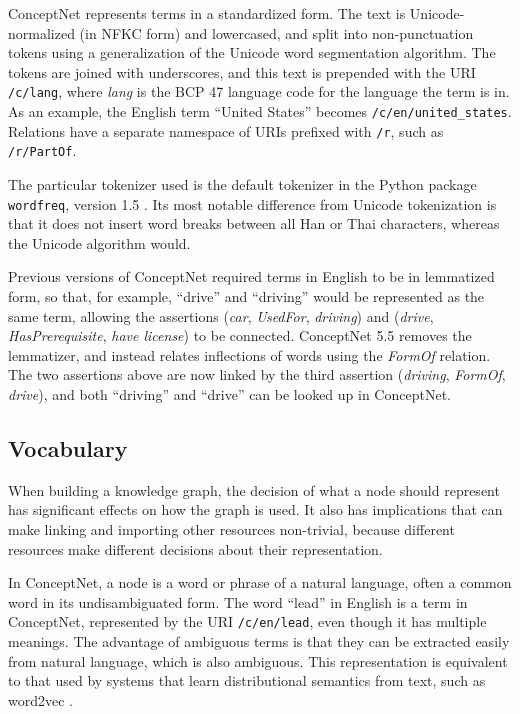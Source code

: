 \documentclass[letterpaper]{article}
\begin{document}
ConceptNet represents terms in a standardized form. The text is
Unicode-normalized (in NFKC form) and lowercased, and split into
non-punctuation tokens using a generalization of the Unicode word
segmentation algorithm. The tokens are joined with underscores, and this
text is prepended with the URI \texttt{/c/lang}, where \emph{lang} is
the BCP 47 language code for the language the term is in. As an example,
the English term ``United States'' becomes
\texttt{/c/en/united\_states}. Relations have a separate namespace of
URIs prefixed with \texttt{/r}, such as \texttt{/r/PartOf}.

The particular tokenizer used is the default tokenizer in the Python package
\texttt{wordfreq}, version 1.5 \cite{speer2016wordfreq}. Its most notable
difference from Unicode tokenization is that it does not insert word breaks
between all Han or Thai characters, whereas the Unicode algorithm would.

Previous versions of ConceptNet required terms in English to be in lemmatized
form, so that, for example, ``drive'' and ``driving'' would be represented as
the same term, allowing the assertions (\emph{car}, \emph{UsedFor},
\emph{driving}) and (\emph{drive}, \emph{HasPrerequisite}, \emph{have license})
to be connected. ConceptNet 5.5 removes the lemmatizer, and instead
relates inflections of words using the \emph{FormOf} relation. The two
assertions above are now linked by the third assertion (\emph{driving},
\emph{FormOf}, \emph{drive}), and both ``driving'' and ``drive'' can be looked
up in ConceptNet.


\subsection{Vocabulary}\label{vocabulary}

When building a knowledge graph, the decision of what a node should
represent has significant effects on how the graph is used. It also has
implications that can make linking and importing other resources
non-trivial, because different resources make different decisions about
their representation.

In ConceptNet, a node is a word or phrase of a natural language, often a
common word in its undisambiguated form. The word ``lead'' in English is
a term in ConceptNet, represented by the URI \texttt{/c/en/lead}, even
though it has multiple meanings. The advantage of ambiguous terms is
that they can be extracted easily from natural language, which is also
ambiguous. This representation is equivalent to that used by systems
that learn distributional semantics from text, such as word2vec
\cite{mikolov2013word2vec}.
\end{document}
